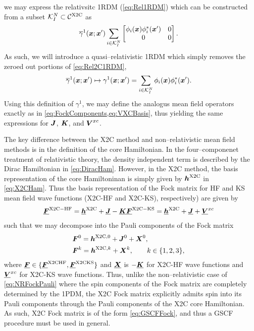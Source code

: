 we may express the relativsitc 1RDM  (\cref{eq:Rel1RDM}) which can be constructed from a 
subset $\mathcal K_I^N \subset \mathcal C^{\mathrm{X2C}}$ as
\begin{equation}
  \label{eq:Rel2C1RDM}
  \overline{\gamma}^1(\boldsymbol{x}; \boldsymbol{x}')
    \sum_{i \in \mathcal K^N_I} 
    \begin{bmatrix} 
      \phi_i(\boldsymbol{x}) \phi_i^{*}(\boldsymbol{x}') & 0 \\ 0 & 0 
    \end{bmatrix}. 
\end{equation}
As such, we will introduce a quasi--relativistic 1RDM which simply removes the zeroed out portions of \cref{eq:Rel2C1RDM},
\begin{equation}
  \label{eq:QRel2C1RDM}
  \overline{\gamma}^1(\boldsymbol{x}; \boldsymbol{x}') \mapsto {\gamma}^1(\boldsymbol{x}; \boldsymbol{x}') =
    \sum_{i \in \mathcal K^N_I} 
      \phi_i(\boldsymbol{x}) \phi_i^{*}(\boldsymbol{x}').
\end{equation}
Using this definition of $\gamma^1$, we may define the analogus mean field operators exactly as in 
\cref{eq:FockComponents,eq:VXCBasis}, thus yielding the same expressions for $\boldsymbol{J}$, $\boldsymbol{K}$, and $\boldsymbol{V}^{xc}$.


The key difference between the X2C method and non--relativistic mean field methods is in the definition of
the core Hamiltonian. In the four--componenet treatment of relativistic theory, the density independent term
is described by the Dirac Hamiltonian in \cref{eq:DiracHam}. However, in the X2C method, the basis representation
of the core Hamiltoninan is simply given by $\boldsymbol{h}^{\mathrm{X2C}}$ in \cref{eq:X2CHam}. Thus the basis representation of
the Fock matrix for HF and KS mean field wave functions (X2C-HF and X2C-KS), respectively) are given by
\begin{align}
  \boldsymbol{\underline{F}}^\mathrm{X2C-HF} = \boldsymbol{\underline{h}}^{\mathrm{X2C}} + \boldsymbol{\underline{J}} - \boldsymbol{\underline{K}}
  \boldsymbol{\underline{F}}^\mathrm{X2C-KS} = \boldsymbol{\underline{h}}^{\mathrm{X2C}} + \boldsymbol{\underline{J}} + \boldsymbol{\underline{V}}^{xc}
\end{align}
such that we may decompose into the Pauli components of the Fock matrix
\begin{align}
  &\boldsymbol{F}^{0} = \boldsymbol{h}^{\mathrm{X2C},0} + \boldsymbol{J}^0 + \boldsymbol{X}^0, \\
  &\boldsymbol{F}^{k} = \boldsymbol{h}^{\mathrm{X2C},k} +  \boldsymbol{X}^k,\qquad k\in \{1,2,3\},
\end{align}
where $\boldsymbol{\underline{F}} \in \{\boldsymbol{\underline{F}}^\mathrm{X2CHF}, \boldsymbol{\underline{F}}^\mathrm{X2CKS} \}$ and $\boldsymbol{\underline{X}}$ is $-\boldsymbol{\underline{K}}$ for X2C-HF
wave functions and  $\boldsymbol{\underline{V}}^{xc}$ for X2C-KS wave functions. Thus, unlike the non--relativistic case of 
\cref{eq:NRFockPauli} where the spin components of the Fock matrix are completely determined by the 1PDM, the 
X2C Fock matrix explicitly admits spin into its Pauli components through the Pauli components of the X2C
core Hamiltonian. As such, X2C Fock matrix is of the form \cref{eq:GSCFFock}, and thus a GSCF procedure 
must be used in general.













